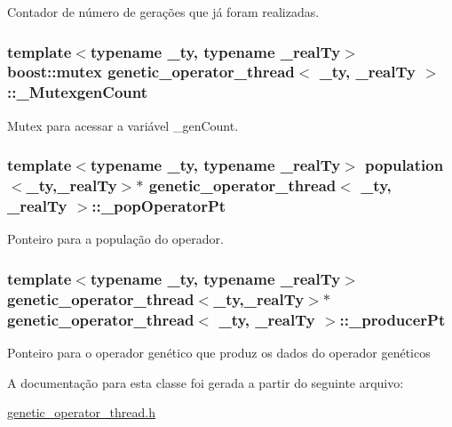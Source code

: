 \label{classgenetic__operator__thread_acdf9606e26ae1240cd1c9fced36c656a}
Contador de número de gerações que já foram realizadas. \hypertarget{classgenetic__operator__thread_afb4be1bcb256082a4d6e90faba3e5567}{
\subsubsection[{\_\-MutexgenCount}]{\setlength{\rightskip}{0pt plus 5cm}template$<$typename \_\-ty, typename \_\-realTy$>$ boost::mutex {\bf genetic\_\-operator\_\-thread}$<$ \_\-ty, \_\-realTy $>$::{\bf \_\-MutexgenCount}}}
\label{classgenetic__operator__thread_afb4be1bcb256082a4d6e90faba3e5567}
Mutex para acessar a variável \_\-genCount. \hypertarget{classgenetic__operator__thread_ae0bb1f4c8c30c5557eefc870d2767d66}{
\subsubsection[{\_\-popOperatorPt}]{\setlength{\rightskip}{0pt plus 5cm}template$<$typename \_\-ty, typename \_\-realTy$>$ {\bf population}$<$\_\-ty,\_\-realTy$>$$\ast$ {\bf genetic\_\-operator\_\-thread}$<$ \_\-ty, \_\-realTy $>$::{\bf \_\-popOperatorPt}}}
\label{classgenetic__operator__thread_ae0bb1f4c8c30c5557eefc870d2767d66}
Ponteiro para a população do operador. \hypertarget{classgenetic__operator__thread_af325a8a1c9964fc0eac9e2eeda670499}{
\subsubsection[{\_\-producerPt}]{\setlength{\rightskip}{0pt plus 5cm}template$<$typename \_\-ty, typename \_\-realTy$>$ {\bf genetic\_\-operator\_\-thread}$<$\_\-ty,\_\-realTy$>$$\ast$ {\bf genetic\_\-operator\_\-thread}$<$ \_\-ty, \_\-realTy $>$::{\bf \_\-producerPt}}}
\label{classgenetic__operator__thread_af325a8a1c9964fc0eac9e2eeda670499}
Ponteiro para o operador genético que produz os dados do operador genéticos 

A documentação para esta classe foi gerada a partir do seguinte arquivo:\begin{DoxyCompactItemize}
\item 
\hyperlink{genetic__operator__thread_8h}{genetic\_\-operator\_\-thread.h}\end{DoxyCompactItemize}
